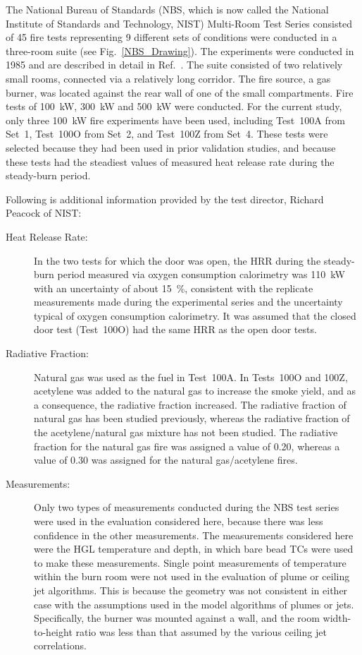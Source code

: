 The National Bureau of Standards (NBS, which is now called the National Institute of Standards
and Technology, NIST) Multi-Room Test Series consisted of 45 fire tests representing
9 different sets of conditions were conducted in a three-room suite (see Fig.~\ref{NBS_Drawing}). The experiments were
conducted in 1985 and are described in detail in Ref.~\cite{Peacock:NBS_Multi-Room}. The suite consisted of two relatively
small rooms, connected via a relatively long corridor. The fire source, a gas burner, was located
against the rear wall of one of the small compartments.
Fire tests of 100~kW, 300~kW and 500~kW were conducted. For the current study, only three 100~kW fire experiments have been used,
including Test~100A from Set~1, Test~100O from Set~2, and Test~100Z from Set~4. These tests
were selected because they had been used in prior validation studies, and because these tests had the
steadiest values of measured heat release rate during the steady-burn period.

Following is additional information provided by the test director, Richard Peacock of NIST:
\begin{description}
\item[Heat Release Rate:] In the two tests for which
the door was open, the HRR during the steady-burn period measured via oxygen consumption
calorimetry was 110~kW with an uncertainty of about 15~\%, consistent with the replicate
measurements made during the experimental series and the uncertainty typical of oxygen
consumption calorimetry. It was assumed that the closed door test (Test~100O) had the same HRR as the open
door tests.
\item[Radiative Fraction:] Natural gas was used as the fuel in
Test~100A. In Tests~100O and 100Z, acetylene was added to the natural gas to increase the
smoke yield, and as a consequence, the radiative fraction increased. The radiative fraction of
natural gas has been studied previously, whereas the radiative fraction of the acetylene/natural
gas mixture has not been studied. The radiative fraction for the natural gas fire was assigned a
value of 0.20, whereas a value of 0.30 was assigned for the natural gas/acetylene fires.
\item[Measurements:] Only two types of measurements conducted during the NBS test series were used in the
evaluation considered here, because there was less confidence in the other measurements.
The measurements considered here were the HGL temperature and depth, in which bare bead
TCs were used to make these measurements. Single point measurements of temperature within
the burn room were not used in the evaluation of plume or ceiling jet algorithms. This is because
the geometry was not consistent in either case with the assumptions used in the model algorithms
of plumes or jets. Specifically, the burner was mounted against a wall, and the room width-to-height
ratio was less than that assumed by the various ceiling jet correlations.
\end{description}


